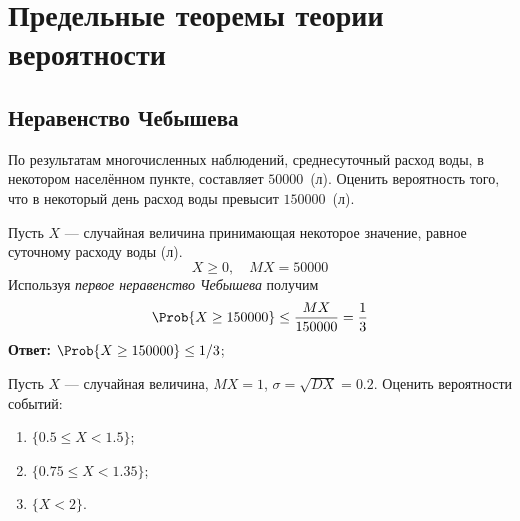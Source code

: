 
\section{Предельные теоремы теории вероятности}


\subsection{Неравенство Чебышева}

\begin{thm}
	
\end{thm}

\begin{thm}
	
\end{thm}

\begin{exm}
	По результатам многочисленных наблюдений, среднесуточный расход воды, в некотором населённом пункте, составляет $50000$~(л). Оценить вероятность того, что в некоторый день расход воды превысит $150000$~(л).
\end{exm}

\begin{slv}
	Пусть $X$ --- случайная величина принимающая некоторое значение, равное суточному расходу воды (л).
	\[
		X \geq 0, \quad MX = 50000
	\]
	Используя \textit{первое неравенство Чебышева} получим
	\[
		\Prob\{X \geq 150000\} \leq \frac{MX}{150000} = \frac{1}{3}
	\]
	\textbf{Ответ:} $\Prob\{X \geq 150000\} \leq 1/3$;
\end{slv}


\begin{exm}
	Пусть $X$ --- случайная величина, $MX = 1$, $\sigma = \sqrt{DX} = 0.2$. Оценить вероятности событий:
	\begin{enumerate}
		\item $\{ 0.5 \leq X < 1.5 \}$;
		\item $\{ 0.75 \leq X < 1.35 \}$;
		\item $\{ X < 2 \}$.	
	\end{enumerate}
\end{exm}

